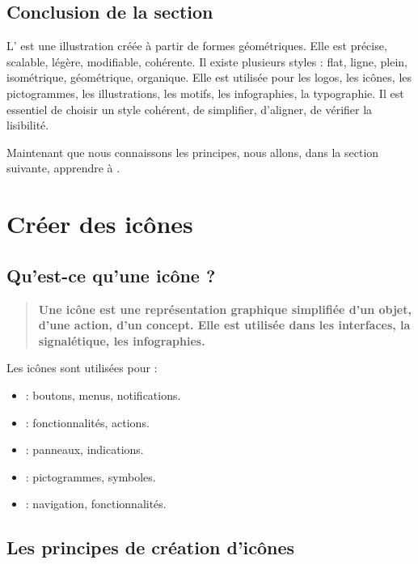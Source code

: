 \subsection*{Conclusion de la section}

L' est une illustration créée à partir de formes géométriques. Elle est précise, scalable, légère, modifiable, cohérente. Il existe plusieurs styles : flat, ligne, plein, isométrique, géométrique, organique. Elle est utilisée pour les logos, les icônes, les pictogrammes, les illustrations, les motifs, les infographies, la typographie. Il est essentiel de choisir un style cohérent, de simplifier, d'aligner, de vérifier la lisibilité.

Maintenant que nous connaissons les principes, nous allons, dans la section suivante, apprendre à .

\section{Créer des icônes}

\subsection{Qu'est-ce qu'une icône ?}

\begin{quote}
\textbf{Une icône est une représentation graphique simplifiée d'un objet, d'une action, d'un concept. Elle est utilisée dans les interfaces, la signalétique, les infographies.}
\end{quote}

Les icônes sont utilisées pour :

\begin{itemize}
    \item {} : boutons, menus, notifications.
    \item {} : fonctionnalités, actions.
    \item {} : panneaux, indications.
    \item {} : pictogrammes, symboles.
    \item {} : navigation, fonctionnalités.
\end{itemize}

\subsection{Les principes de création d'icônes}

